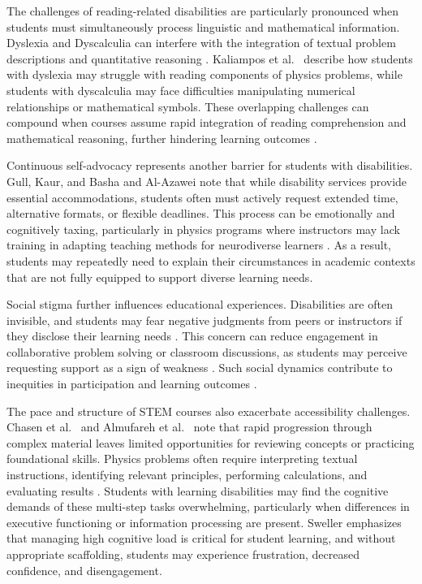 \documentclass[]{aastex701}
\begin{document}
The challenges of reading-related disabilities are particularly pronounced when students must simultaneously process linguistic and mathematical information. Dyslexia and Dyscalculia can interfere with the integration of textual problem descriptions and quantitative reasoning \citep{Kontopoulou2024}. Kaliampos et al.\ \citep{Kaliampos2025} describe how students with dyslexia may struggle with reading components of physics problems, while students with dyscalculia may face difficulties manipulating numerical relationships or mathematical symbols. These overlapping challenges can compound when courses assume rapid integration of reading comprehension and mathematical reasoning, further hindering learning outcomes \citep{Kontopoulou2024}.

Continuous self-advocacy represents another barrier for students with disabilities. Gull, Kaur, and Basha \citep{Gull2025} and Al-Azawei \citep{AlAzawei2023} note that while disability services provide essential accommodations, students often must actively request extended time, alternative formats, or flexible deadlines. This process can be emotionally and cognitively taxing, particularly in physics programs where instructors may lack training in adapting teaching methods for neurodiverse learners \citep{Almufareh2025, Kaliampos2025}. As a result, students may repeatedly need to explain their circumstances in academic contexts that are not fully equipped to support diverse learning needs.

Social stigma further influences educational experiences. Disabilities are often invisible, and students may fear negative judgments from peers or instructors if they disclose their learning needs \citep{Gull2025, AlAzawei2023}. This concern can reduce engagement in collaborative problem solving or classroom discussions, as students may perceive requesting support as a sign of weakness \citep{Gull2025, AlAzawei2023}. Such social dynamics contribute to inequities in participation and learning outcomes \citep{AlAzawei2023}.

The pace and structure of STEM courses also exacerbate accessibility challenges. Chasen et al.\ \citep{Chasen2025} and Almufareh et al.\ \citep{Almufareh2025} note that rapid progression through complex material leaves limited opportunities for reviewing concepts or practicing foundational skills. Physics problems often require interpreting textual instructions, identifying relevant principles, performing calculations, and evaluating results \citep{Kontopoulou2024, Sweller2011}. Students with learning disabilities may find the cognitive demands of these multi-step tasks overwhelming, particularly when differences in executive functioning or information processing are present. Sweller \citep{Sweller2011} emphasizes that managing high cognitive load is critical for student learning, and without appropriate scaffolding, students may experience frustration, decreased confidence, and disengagement.
\end{document}
